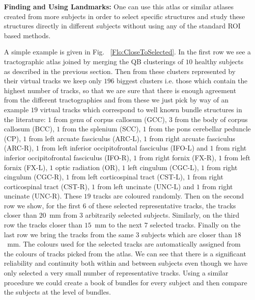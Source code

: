 \documentclass[preprint,authoryear,a4paper,10pt,onecolumn]{elsarticle}
\begin{document}

\textbf{Finding and Using Landmarks:} One can use this atlas or similar
atlases created from more subjects in order to select specific
structures and study these structures directly in different subjects
without using any of the standard ROI based methods.

A simple example is given in Fig. ~\ref{Flo:CloseToSelected}. In the
first row we see a tractographic atlas joined by merging the QB
clusterings of $10$ healthy subjects as described in the previous
section. Then from these clusters represented by their virtual tracks we
keep only $196$ biggest clusters i.e. those which contain the highest
number of tracks, so that we are sure that there is enough agreement
from the different tractographies and from these we just pick by way of
an example $19$ virtual tracks which correspond to well known bundle
structures in the literature: $1$ from genu of corpus callosum (GCC),
$3$ from the body of corpus callosum (BCC), $1$ from the splenium (SCC),
$1$ from the pons cerebellar peduncle (CP), $1$ from left arcuate
fasciculus (ARC-L), $1$ from right arcuate fasciculus (ARC-R), $1$ from
left inferior occipitofrontal fasciculus (IFO-L) and $1$ from right
inferior occipitofrontal fasciculus (IFO-R), $1$ from right fornix
(FX-R), $1$ from left fornix (FX-L), $1$ optic radiation (OR), $1$ left
cingulum (CGC-L), $1$ from right cingulum (CGC-R), $1$ from left
corticospinal tract (CST-L), $1$ from right corticospinal tract (CST-R),
$1$ from left uncinate (UNC-L) and $1$ from right uncinate
(UNC-R). These $19$ tracks are coloured randomly. Then on the second row
we show, for the first $6$ of these selected representative tracks, the
tracks closer than $20$~mm from $3$ arbitrarily selected
subjects. Similarly, on the third row the tracks closer than $15$~mm to
the next $7$ selected tracks. Finally on the last row we bring the
tracks from the same $3$ subjects which are closer than $18$~mm.  The
colours used for the selected tracks are automatically assigned from the
colours of tracks picked from the atlas. We can see that there is a
significant reliability and continuity both within and between subjects
even though we have only selected a very small number of representative
tracks. Using a similar procedure we could create a book of bundles for
every subject and then compare the subjects at the level of bundles.
\end{document}
